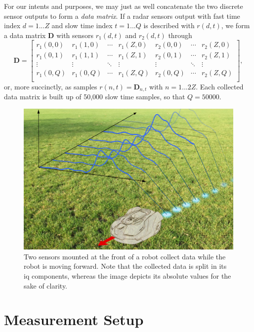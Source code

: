 For our intents and purposes, we may just as well concatenate the two discrete sensor outputs to form a \emph{data matrix}. If a radar sensors output with fast time index $d=1...Z$ and slow time index $t=1...Q$ is described with $r(d,t)$, we form a data matrix $\mathbf{D}$ with sensors $r_1(d,t)$ and $r_2(d,t)$ through
\begin{equation}
	\mathbf{D}= 
	\begin{bmatrix}
		r_1(0,0) & r_1(1,0) & \cdots & r_1(Z,0) & r_2(0,0) & \cdots & r_2(Z,0) \\
		r_1(0,1) & r_1(1,1) & \cdots & r_1(Z,1) & r_2(0,1) & \cdots & r_2(Z,1) \\
		\vdots &  \vdots & \ddots & \vdots & \vdots & \ddots &  \vdots \\
		r_1(0,Q) & r_1(0,Q) & \cdots  & r_1(Z,Q) & r_2(0,Q) & \cdots  & r_2(Z,Q) \\
	\end{bmatrix}
	,
\end{equation}
or, more succinctly, as samples $r(n,t) = \mathbf{D}_{n,t}$ with $n=1...2Z$. Each collected data matrix is built up of 50,000 slow time samples, so that $Q=50000$.

\begin{figure}
	\centering
	\includegraphics[scale=0.60]{figs_temp/data_collecting.jpg}
	\caption{Two sensors mounted at the front of a robot collect data while the robot is moving forward. Note that the collected data is split in its \gls{iq} components, whereas the image depicts its absolute values for the sake of clarity.}
	\label{fig:data_collecting}
\end{figure}

\section{Measurement Setup}

